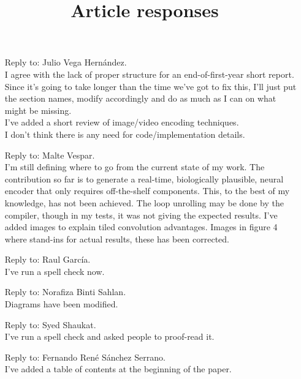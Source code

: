 \documentclass[11pt,a4paper]{article}
\title{Article responses}
\begin{document}
\maketitle
\begin{itemize}
	\item[Reply to:]Julio Vega Hern\'andez.\\
	I agree with the lack of proper structure for an end-of-first-year short report. Since it's going to take longer than the time we've got to fix this, I'll just put the section names, modify accordingly  and do as much as I can on what might be missing.\\
	I've added a short review of image/video encoding techniques.\\
    I don't think there is any need for code/implementation details.
\item[Reply to:] Malte Vespar.\\
	I'm still defining where to go from the current state of my work. The contribution so far is to generate a real-time, biologically plausible, neural encoder that only requires off-the-shelf components. This, to the best of my knowledge, has not been achieved.
	The loop unrolling may be done by the compiler, though in my tests, it was not
	giving the expected results.
	I've added images to explain tiled convolution advantages.
	Images in figure 4 where stand-ins for actual results, these has been corrected.
\item[Reply to:] Raul Garc\'ia.\\
	I've run a spell check now.
\item[Reply to:] Norafiza Binti Sahlan.\\
	Diagrams have been modified.
\item[Reply to:] Syed Shaukat. \\
	I've run a spell check and asked people to proof-read it.
\item[Reply to:] Fernando Ren\'e S\'anchez Serrano. \\
	I've added a table of contents at the beginning of the paper.
\end{itemize}
\end{document}
